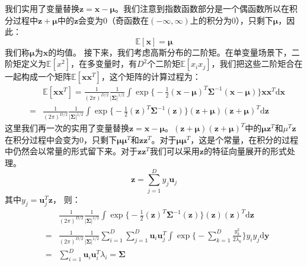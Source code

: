 \documentclass[10pt,a4paper,UTF8]{article}
\begin{document}
我们实用了变量替换\(\mathbf{z} = \mathbf{x} - \mathbf{\mu}\)。我们注意到指数函数部分是一个偶函数所以在积分过程中\(\mathbf{z}+\mathbf{\mu}\)中的\(\mathbf{z}\)会变为\(0\)（奇函数在\((-\infty,\infty)\)上的积分为\(0\)），只剩下\(\mathbf{\mu}\)，因此：
\begin{equation}
\label{eq:17}
\mathbb{E}[\mathbf{x}] = \mathbf{\mu}
\end{equation}
我们称\(\mathbf{\mu}\)为\(\mathbf{x}\)的均值。
接下来，我们考虑高斯分布的二阶矩。在单变量场景下，二阶矩定义为\(\mathbb{E}[x^{2}]\)，在多变量时，有\(D^{2}\)个二阶矩\(\mathbb{E}[x_{i}x_{j}]\)，我们把这些二阶矩合在一起构成一个矩阵\(\mathbb{E}[\mathbf{x}\mathbf{x}^{T}]\)，这个矩阵的计算过程为：
\begin{eqnarray}
\label{eq:18}
&&\mathbb{E}[\mathbf{x}\mathbf{x}^{T}] =  \frac{1}{(2\pi)^{D/2}}\frac{1}{|\mathbf{\Sigma}|^{1/2}}\int \exp\bigg\{ -\frac{1}{2}(\mathbf{x}- \mathbf{\mu})^{T}\mathbf{\Sigma}^{-1}(\mathbf{x} - \mathbf{\mu})\bigg\}\mathbf{x}\mathbf{x}^{T}\mathrm{d}\mathbf{x} \\
&=& \frac{1}{(2\pi)^{D/2}}\frac{1}{|\mathbf{\Sigma}|^{1/2}}\int \exp\bigg\{ -\frac{1}{2}(\mathbf{z})^{T}\mathbf{\Sigma}^{-1}(\mathbf{z})\bigg\}(\mathbf{z}+ \mathbf{\mu})(\mathbf{z}+ \mathbf{\mu})^{T}\mathrm{d}\mathbf{z}
\end{eqnarray}
这里我们再一次的实用了变量替换\(\mathbf{z} = \mathbf{x} - \mathbf{\mu}\)。\((\mathbf{z}+ \mathbf{\mu})(\mathbf{z}+ \mathbf{\mu})^{T}\)中的\(\mathbf{\mu}\mathbf{z}^{T}\)和\(\mu^{T}\mathbf{z}\)在积分过程中会变为\(0\)，只剩下\(\mathbf{\mu}\mathbf{\mu}^{T}\)和\(\mathbf{z}\mathbf{z}^{T}\)。对于\(\mathbf{\mu}\mathbf{\mu}^{T}\)，这是个常量，在积分的过程中仍然会以常量的形式留下来。对于\(\mathbf{z}\mathbf{z}^{T}\)我们可以采用\(\mathbf{z}\)的特征向量展开的形式处理。
\begin{equation}
\label{eq:19}
\mathbf{z} = \sum_{j=1}^{D}y_{j}\mathbf{u}_{j}
\end{equation}
其中\(y_{j} = \mathbf{u}_{j}^{T}\mathbf{z}\)， 则：
\begin{eqnarray}
\label{eq:20}
&& \frac{1}{(2\pi)^{D/2}}\frac{1}{|\mathbf{\Sigma}|^{1/2}}\int \exp\bigg\{ -\frac{1}{2}(\mathbf{z})^{T}\mathbf{\Sigma}^{-1}(\mathbf{z})\bigg\}(\mathbf{z})(\mathbf{z})^{T}\mathrm{d}\mathbf{z} \\
&=&  \frac{1}{(2\pi)^{D/2}}\frac{1}{|\mathbf{\Sigma}|^{1/2}} \sum_{i=1}^{D}\sum_{j=1}^{D} \mathbf{u}_{i}\mathbf{u}_{j}^{T} \int \exp \bigg\{ -\sum_{k=1}^{D}\frac{y_{k}^{2}}{2\lambda_{k}} \bigg\}y_{i}y_{j}\mathrm{d} \mathbf{y} \\
&=& \sum_{i=1}^{D}\mathbf{u}_{i}\mathbf{u}_{i}^{T}\lambda_{i} = \mathbf{\Sigma}
\end{eqnarray}
\end{document}
